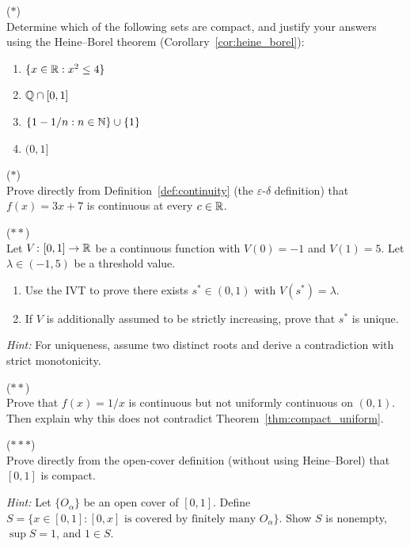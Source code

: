 \documentclass[11pt,a4paper]{article}
\begin{document}
\begin{exercise}
\textnormal{(\(*\))} \\
Determine which of the following sets are compact, and justify your answers
using the Heine--Borel theorem (Corollary~\ref{cor:heine_borel}):
\begin{enumerate}[nosep,label=(\alph*)]
  \item $\{x \in \mathbb{R} : x^2 \le 4\}$
  \item $\mathbb{Q} \cap [0, 1]$
  \item $\{1 - 1/n : n \in \mathbb{N}\} \cup \{1\}$
  \item $(0, 1]$
\end{enumerate}
\end{exercise}

\begin{exercise}
\textnormal{(\(*\))} \\
Prove directly from Definition~\ref{def:continuity} (the
$\varepsilon$-$\delta$ definition) that $f(x) = 3x + 7$ is continuous at
every $c \in \mathbb{R}$.
\end{exercise}

\begin{exercise}
\textnormal{(\(**\))} \\
Let $V \colon [0, 1] \to \mathbb{R}$ be a continuous function with $V(0) = -1$ and
$V(1) = 5$. Let $\lambda \in (-1, 5)$ be a threshold value.
\begin{enumerate}[nosep,label=(\alph*)]
  \item Use the IVT to prove there exists $s^* \in (0, 1)$ with
    $V(s^*) = \lambda$.
  \item If $V$ is additionally assumed to be strictly increasing, prove
    that $s^*$ is unique.
\end{enumerate}
\textit{Hint:} For uniqueness, assume two distinct roots and derive a
contradiction with strict monotonicity.
\end{exercise}

\begin{exercise}
\textnormal{(\(**\))} \\
Prove that $f(x) = 1/x$ is continuous but not uniformly continuous on
$(0, 1)$. Then explain why this does not contradict
Theorem~\ref{thm:compact_uniform}.
\end{exercise}

\begin{exercise}
\textnormal{(\(***\))} \\
Prove directly from the open-cover definition (without using Heine--Borel)
that $[0, 1]$ is compact.

\textit{Hint:} Let $\{O_\alpha\}$ be an open cover of $[0,1]$. Define
$S = \{x \in [0,1] : [0,x] \text{ is covered by finitely many }
O_\alpha\}$. Show $S$ is nonempty, $\sup S = 1$, and $1 \in S$.
\end{exercise}
\end{document}
